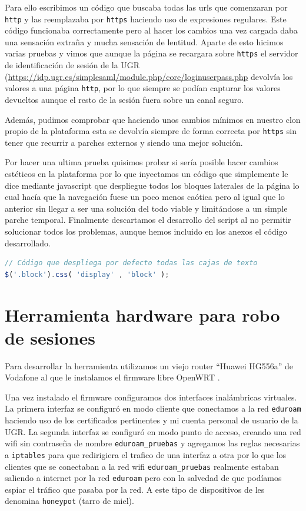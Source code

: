 \bigskip
Para ello escribimos un código que buscaba todas las urls que comenzaran por \texttt{http} y las reemplazaba por \texttt{https} haciendo uso de expresiones regulares. Este código funcionaba correctamente pero al hacer los cambios una vez cargada daba una sensación extraña y mucha sensación de lentitud. Aparte de esto hicimos varias pruebas y vimos que aunque la página se recargara sobre \texttt{https} el servidor de identificación de sesión de la UGR (\url{https://idp.ugr.es/simplesaml/module.php/core/loginuserpass.php} devolvía los valores a una página \texttt{http}, por lo que siempre se podían capturar los valores devueltos aunque el resto de la sesión fuera sobre un canal seguro.

\bigskip
Además, pudimos comprobar que haciendo unos cambios mínimos en nuestro clon propio de la plataforma esta se devolvía siempre de forma correcta por \texttt{https} sin tener que recurrir a parches externos y siendo una mejor solución.

\bigskip
Por hacer una ultima prueba quisimos probar si sería posible hacer cambios estéticos en la plataforma por lo que inyectamos un código que simplemente le dice mediante javascript que despliegue todos los bloques laterales de la página lo cual hacía que la navegación fuese un poco menos caótica pero al igual que lo anterior sin llegar a ser una solución del todo viable y limitándose a un simple parche temporal. Finalmente descartamos el desarrollo del script al no permitir solucionar todos los problemas, aunque hemos incluido en los anexos el código desarrollado.

\begin{lstlisting}[language=javascript]
// Código que despliega por defecto todas las cajas de texto
$('.block').css( 'display' , 'block' );
\end{lstlisting}


\section{Herramienta hardware para robo de sesiones}

Para desarrollar la herramienta utilizamos un viejo router ``Huawei HG556a'' de Vodafone al que le instalamos el firmware libre OpenWRT \cite{openwrt}.

\bigskip
Una vez instalado el firmware configuramos dos interfaces inalámbricas virtuales. La primera interfaz se configuró en modo cliente que conectamos a la red \texttt{eduroam} haciendo uso de los certificados pertinentes y mi cuenta personal de usuario de la UGR. La segunda interfaz se configuró en modo punto de acceso, creando una red wifi sin contraseña de nombre \texttt{eduroam\_pruebas} y agregamos las reglas necesarias a \texttt{iptables} para que redirigiera el trafico de una interfaz a otra por lo que los clientes que se conectaban a la red wifi \texttt{eduroam\_pruebas} realmente estaban saliendo a internet por la red \texttt{eduroam} pero con la salvedad de que podíamos espiar el tráfico que pasaba por la red. A este tipo de dispositivos de les denomina \texttt{honeypot} (tarro de miel).


